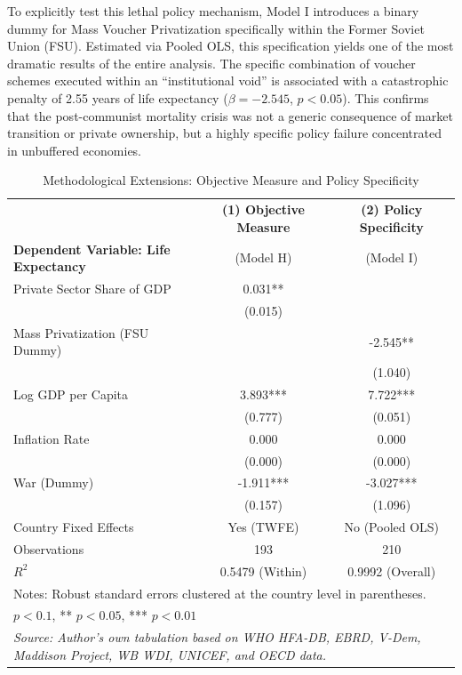 \documentclass[en,magisterska]{pracamgr}
\begin{document}
To explicitly test this lethal policy mechanism, Model I introduces a binary dummy for Mass Voucher Privatization specifically within the Former Soviet Union (FSU). Estimated via Pooled OLS, 
this specification yields one of the most dramatic results of the entire analysis. The specific combination of voucher schemes executed within an ``institutional void'' is associated with a 
catastrophic penalty of 2.55 years of life expectancy ($\beta = -2.545$, $p < 0.05$). This confirms that the post-communist mortality crisis was not a generic consequence of market transition 
or private ownership, but a highly specific policy failure concentrated in unbuffered economies.

\begin{table}[H]
\centering
\caption{Methodological Extensions: Objective Measure and Policy Specificity}
\label{tab:extensions}
\footnotesize
\begin{tabular}{l c c}
\toprule
 & \textbf{(1) Objective Measure} & \textbf{(2) Policy Specificity} \\
\textbf{Dependent Variable: Life Expectancy} & (Model H) & (Model I) \\
\midrule
Private Sector Share of GDP & 0.031** & \\
 & (0.015) & \\
Mass Privatization (FSU Dummy) & & -2.545** \\
 & & (1.040) \\
Log GDP per Capita & 3.893*** & 7.722*** \\
 & (0.777) & (0.051) \\
Inflation Rate & 0.000 & 0.000 \\
 & (0.000) & (0.000) \\
War (Dummy) & -1.911*** & -3.027*** \\
 & (0.157) & (1.096) \\
\midrule
Country Fixed Effects & Yes (TWFE) & No (Pooled OLS) \\
Observations & 193 & 210 \\
$R^2$ & 0.5479 (Within) & 0.9992 (Overall) \\
\bottomrule
\multicolumn{3}{l}{\scriptsize Notes: Robust standard errors clustered at the country level in parentheses.} \\
\multicolumn{3}{l}{\scriptsize * $p<0.1$, ** $p<0.05$, *** $p<0.01$} \\
\multicolumn{3}{l}{\scriptsize \textit{Source: Author's own tabulation based on WHO HFA-DB, EBRD, V-Dem, Maddison Project, WB WDI, UNICEF, and OECD data.}} \\
\end{tabular}
\end{table}
\end{document}
